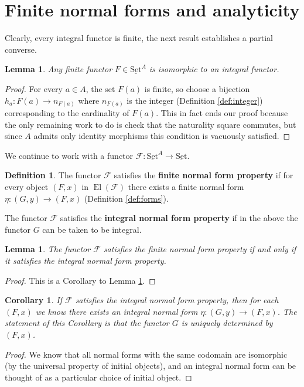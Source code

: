 \documentclass[12pt]{article}
\theoremstyle{plain}
\newtheorem{lemma}[thm]{Lemma}
\newtheorem{cor}[thm]{Corollary}
\theoremstyle{definition}
\newtheorem{defn}[thm]{Definition} %
\newcommand{\scr}[1]{\mathscr{#1}}
\newcommand{\lto}{\longrightarrow}
\newcommand{\set}{\operatorname{\underline{Set}}}
\begin{document}
	\section{Finite normal forms and analyticity}
	Clearly, every integral functor is finite, the next result establishes a partial converse.
	\begin{lemma}\label{lem:finite--->integral}
		Any finite functor $F \in \set^A$ is isomorphic to an integral functor.
		\end{lemma}
	\begin{proof}
		For every $a \in A$, the set $F(a)$ is finite, so choose a bijection $h_a: F(a) \lto n_{F(a)}$ where $n_{F(a)}$ is the integer (Definition \ref{def:integer}) corresponding to the cardinality of $F(a)$. This in fact ends our proof because the only remaining work to do is check that the naturality square commutes, but since $A$ admits only identity morphisms this condition is vacuously satisfied.
		\end{proof}
	
	We continue to work with a functor $\scr{F}: \set^A \lto \set$.
	
	\begin{defn}\label{def:normal_form_property}
		The functor $\scr{F}$ satisfies the \textbf{finite normal form property} if for every object $(F,x)$ in $\operatorname{El}(\scr{F})$ there exists a finite normal form $\eta: (G,y) \lto (F,x)$ (Definition \ref{def:forms}).
		
		The functor $\scr{F}$ satisfies the \textbf{integral normal form property} if in the above the functor $G$ can be taken to be integral.
		\end{defn}
	
	\begin{lemma}
		The functor $\scr{F}$ satisfies the finite normal form property if and only if it satisfies the integral normal form property.
		\end{lemma}
	\begin{proof}
		This is a Corollary to Lemma \ref{lem:finite--->integral}.
		\end{proof}
	
	\begin{cor}
		If $\scr{F}$ satisfies the integral normal form property, then for each $(F,x)$ we know there exists an integral normal form $\eta: (G, y) \lto (F,x)$. The statement of this Corollary is that the functor $G$ is uniquely determined by $(F,x)$.
		\end{cor}
	\begin{proof}
		We know that all normal forms with the same codomain are isomorphic (by the universal property of initial objects), and an integral normal form can be thought of as a particular choice of initial object.
		\end{proof}
	
\end{document}
